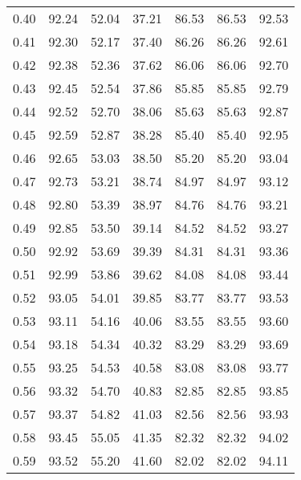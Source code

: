 \begin{tabular}{|c|c|c|c|c|c|c|}
      0.40 &     92.24 &     52.04 &      37.21 &   86.53 &      86.53 &         92.53 \\
      0.41 &     92.30 &     52.17 &      37.40 &   86.26 &      86.26 &         92.61 \\
      0.42 &     92.38 &     52.36 &      37.62 &   86.06 &      86.06 &         92.70 \\
      0.43 &     92.45 &     52.54 &      37.86 &   85.85 &      85.85 &         92.79 \\
      0.44 &     92.52 &     52.70 &      38.06 &   85.63 &      85.63 &         92.87 \\
      0.45 &     92.59 &     52.87 &      38.28 &   85.40 &      85.40 &         92.95 \\
      0.46 &     92.65 &     53.03 &      38.50 &   85.20 &      85.20 &         93.04 \\
      0.47 &     92.73 &     53.21 &      38.74 &   84.97 &      84.97 &         93.12 \\
      0.48 &     92.80 &     53.39 &      38.97 &   84.76 &      84.76 &         93.21 \\
      0.49 &     92.85 &     53.50 &      39.14 &   84.52 &      84.52 &         93.27 \\
      0.50 &     92.92 &     53.69 &      39.39 &   84.31 &      84.31 &         93.36 \\
      0.51 &     92.99 &     53.86 &      39.62 &   84.08 &      84.08 &         93.44 \\
      0.52 &     93.05 &     54.01 &      39.85 &   83.77 &      83.77 &         93.53 \\
      0.53 &     93.11 &     54.16 &      40.06 &   83.55 &      83.55 &         93.60 \\
      0.54 &     93.18 &     54.34 &      40.32 &   83.29 &      83.29 &         93.69 \\
      0.55 &     93.25 &     54.53 &      40.58 &   83.08 &      83.08 &         93.77 \\
      0.56 &     93.32 &     54.70 &      40.83 &   82.85 &      82.85 &         93.85 \\
      0.57 &     93.37 &     54.82 &      41.03 &   82.56 &      82.56 &         93.93 \\
      0.58 &     93.45 &     55.05 &      41.35 &   82.32 &      82.32 &         94.02 \\
      0.59 &     93.52 &     55.20 &      41.60 &   82.02 &      82.02 &         94.11 \\

\end{tabular}
